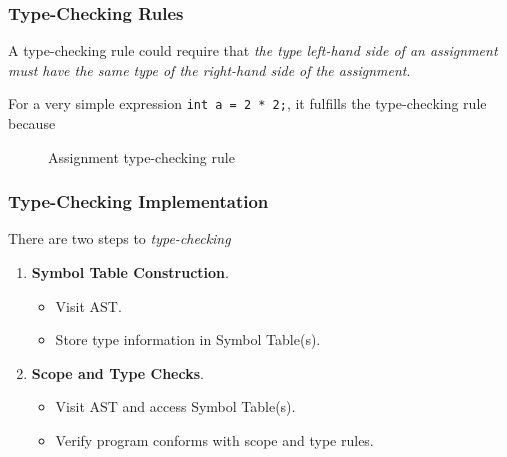 \subsubsection{Type-Checking Rules}

\begin{example}
A type-checking rule could require that \textit{the type left-hand side of an assignment must have the same type of the right-hand side of the assignment}.
    
For a very simple expression \texttt{int a = 2 * 2;}, it fulfills the type-checking rule because
\begin{figure}[H]
    \centering
    \begin{prooftree}
    \end{prooftree}
    \caption{Assignment type-checking rule}
    \label{fig:assignment-type-checking-rule}
\end{figure}
\end{example}

\subsubsection{Type-Checking Implementation}

There are two steps to \textit{type-checking}
\begin{enumerate}
    \item \textbf{Symbol Table Construction}.
    \begin{itemize}
        \item Visit AST.
        \item Store type information in Symbol Table(s).
    \end{itemize}
    \item \textbf{Scope and Type Checks}.
    \begin{itemize}
        \item Visit AST and access Symbol Table(s).
        \item Verify program conforms with scope and type rules.
    \end{itemize}
\end{enumerate}

